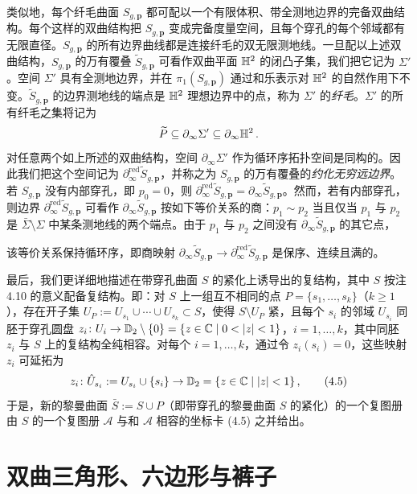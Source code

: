 类似地，每个纤毛曲面 $S_{g,\mathbf p}$ 都可配以一个有限体积、带全测地边界的完备双曲结构。每个这样的双曲结构把 $S_{g,\mathbf p}$ 变成完备度量空间，且每个穿孔的每个邻域都有无限直径。$S_{g,\mathbf p}$ 的所有边界曲线都是连接纤毛的双无限测地线。一旦配以上述双曲结构，$S_{g,\mathbf p}$ 的万有覆叠 $\widetilde{S}_{g,\mathbf p}$ 可看作双曲平面 $\mathbb{H}^2$ 的闭凸子集，我们把它记为 $\Sigma'$。空间 $\Sigma'$ 具有全测地边界，并在 $\pi_1(S_{g,\mathbf p})$ 通过和乐表示对 $\mathbb{H}^2$ 的自然作用下不变。$\widetilde{S}_{g,\mathbf p}$ 的边界测地线的端点是 $\mathbb{H}^2$ 理想边界中的点，称为 $\Sigma'$ 的\emph{纤毛}。$\Sigma'$ 的所有纤毛之集将记为
\[
\widetilde{P}\subseteq\partial_\infty\Sigma'\subseteq\partial_\infty\mathbb{H}^2\,.
\]
对任意两个如上所述的双曲结构，空间 $\partial_\infty\Sigma'$ 作为循环序拓扑空间是同构的。因此我们把这个空间记为 $\partial_\infty^{\mathrm{red}}\widetilde{S}_{g,\mathbf p}$，并称之为 $S_{g,\mathbf p}$ 的万有覆叠的\emph{约化无穷远边界}。若 $S_{g,\mathbf p}$ 没有内部穿孔，即 $p_0=0$，则 $\partial_\infty^{\mathrm{red}}\widetilde{S}_{g,\mathbf p}=\partial_\infty\widetilde{S}_{g,\mathbf p}$。然而，若有内部穿孔，则边界 $\partial_\infty^{\mathrm{red}}\widetilde{S}_{g,\mathbf p}$ 可看作 $\partial_\infty\widetilde{S}_{g,\mathbf p}$ 按如下等价关系的商：$p_1\sim p_2$ 当且仅当 $p_1$ 与 $p_2$ 是 $\bar\Sigma\setminus\Sigma$ 中某条测地线的两个端点。由于 $p_1$ 与 $p_2$ 之间没有 $\partial_\infty\widetilde{S}_{g,\mathbf p}$ 的其它点，

该等价关系保持循环序，即商映射 $\partial_\infty\widetilde{S}_{g,\mathbf p}\to\partial_\infty^{\mathrm{red}}\widetilde{S}_{g,\mathbf p}$ 是保序、连续且满的。

最后，我们更详细地描述在带穿孔曲面 $S$ 的紧化上诱导出的复结构，其中 $S$ 按注 4.10 的意义配备复结构。即：对 $S$ 上一组互不相同的点 $P=\{s_1,\dots,s_k\}$（$k\ge 1$），存在开子集 $U_P:=U_{s_1}\cup\cdots\cup U_{s_k}\subset S$，使得 $S\setminus U_P$ 紧，且每个 $s_i$ 的邻域 $U_{s_i}$ 同胚于穿孔圆盘 $z_i\colon U_i\to\DD_2\setminus\{0\}=\{z\in\C \mid 0<|z|<1\}$，$i=1,\dots,k$，其中同胚 $z_i$ 与 $S$ 上的复结构全纯相容。对每个 $i=1,\dots,k$，通过令 $z_i(s_i)=0$，这些映射 $z_i$ 可延拓为
\begin{equation}
z_i\colon\hat U_{s_i}:=U_{s_i}\cup\{s_i\}\to\mathbb{D}_2=\{z\in\mathbb{C} \mid |z|<1\}\,, \tag{4.5}
\end{equation}
于是，新的黎曼曲面 $\bar S:=S\cup P$（即带穿孔的黎曼曲面 $S$ 的紧化）的一个复图册由 $S$ 的一个复图册 $\mathcal A$ 与和 $\mathcal A$ 相容的坐标卡 (4.5) 之并给出。

\section{双曲三角形、六边形与裤子}

